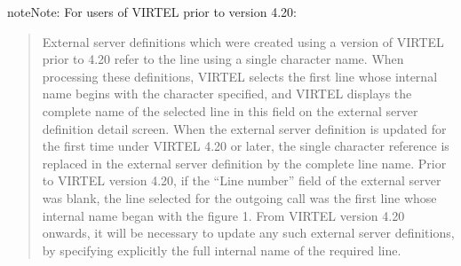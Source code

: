 \documentclass[letterpaper,10pt,english]{sphinxmanual}
\begin{document}
\begin{sphinxadmonition}{note}{Note:}
\sphinxAtStartPar
For users of VIRTEL prior to version 4.20:
\begin{quote}

\sphinxAtStartPar
External server definitions which were created using a version of VIRTEL prior to 4.20 refer to the line using a single character name. When processing these definitions, VIRTEL selects the first line whose internal name begins with the character specified, and VIRTEL displays the complete name of the selected line in this field on the external server definition detail screen. When the external server definition is updated for the first time under VIRTEL 4.20 or later, the single character reference is replaced in the external server definition by the complete line name. Prior to VIRTEL version 4.20, if the “Line number” field of the external server was blank, the line selected for the outgoing call was the first line whose internal name began with the figure 1. From VIRTEL version 4.20 onwards, it will be necessary to update any such external server definitions, by specifying explicitly the full internal name of the required line.
\end{quote}
\end{sphinxadmonition}
\end{document}
